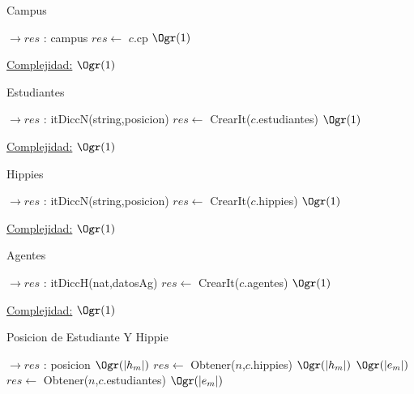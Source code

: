 \begin{Algoritmos}

\begin{algorithm}[H]
\caption{Campus}

\begin{algorithmic}[1]
  $\to res$ : campus
  \State $res \gets$ $c$.cp \Comment $\Ogr(1)$
 \EndProcedure
\end{algorithmic}

 \underline{Complejidad:} $\Ogr(1)$
\end{algorithm}


\begin{algorithm}[H]
\caption{Estudiantes}

\begin{algorithmic}[1]
  $\to res$ : itDiccN(string,posicion)
  \State $res \gets$ CrearIt($c$.estudiantes) \Comment $\Ogr(1)$
 \EndProcedure
\end{algorithmic}
 \underline{Complejidad:} $\Ogr(1)$
\end{algorithm}


\begin{algorithm}[H]
\caption{Hippies}
\begin{algorithmic}[1]
	 $\to res$ : itDiccN(string,posicion)
	\State $res \gets$ CrearIt($c$.hippies) \Comment $\Ogr(1)$
	\EndProcedure
\end{algorithmic}
\underline{Complejidad:} $\Ogr(1)$
\end{algorithm}


\begin{algorithm}[H]
\caption{Agentes}
\begin{algorithmic}[1]
	 $\to res$ : itDiccH(nat,datosAg)
	\State $res \gets$ CrearIt($c$.agentes) \Comment $\Ogr(1)$
	\EndProcedure
\end{algorithmic}
\underline{Complejidad:} $\Ogr(1)$
\end{algorithm}



\begin{algorithm}[H]
\caption{Posicion de Estudiante Y Hippie}

\begin{algorithmic}[1]
 $\to res$ : posicion
	 \Comment $\Ogr(|h_m|)$
		\State $res \gets$ Obtener($n$,$c$.hippies) \Comment $\Ogr(|h_m|)$
	\Else
		 \Comment $\Ogr(|e_m|)$
			\State $res \gets$ Obtener($n$,$c$.estudiantes) \Comment $\Ogr(|e_m|)$
		\EndIf
	\EndIf	
 \EndProcedure
\end{algorithmic}


\end{algorithm}
\end{Algoritmos}
